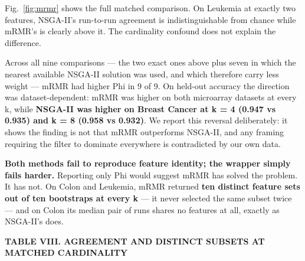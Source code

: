 \documentclass[conference]{IEEEtran}
\begin{document}
Fig.~\ref{fig:mrmr} shows the full matched comparison. On Leukemia at exactly two features, NSGA-II's run-to-run agreement is indistinguishable from chance while mRMR's is clearly above it. The cardinality confound does not explain the difference.

Across all nine comparisons --- the two exact ones above plus seven in which the nearest available NSGA-II solution was used, and which therefore carry less weight --- mRMR had higher Phi in 9 of 9. On held-out accuracy the direction was dataset-dependent: mRMR was higher on both microarray datasets at every k, while \textbf{NSGA-II was higher on Breast Cancer at k = 4 (0.947 vs 0.935) and k = 8 (0.958 vs 0.932)}. We report this reversal deliberately: it shows the finding is not that mRMR outperforms NSGA-II, and any framing requiring the filter to dominate everywhere is contradicted by our own data.

\textbf{Both methods fail to reproduce feature identity; the wrapper simply fails harder.} Reporting only Phi would suggest mRMR has solved the problem. It has not. On Colon and Leukemia, mRMR returned \textbf{ten distinct feature sets out of ten bootstraps at every k} --- it never selected the same subset twice --- and on Colon its median pair of runs shares no features at all, exactly as NSGA-II's does.

\textbf{TABLE VIII. AGREEMENT AND DISTINCT SUBSETS AT MATCHED CARDINALITY}
\end{document}
